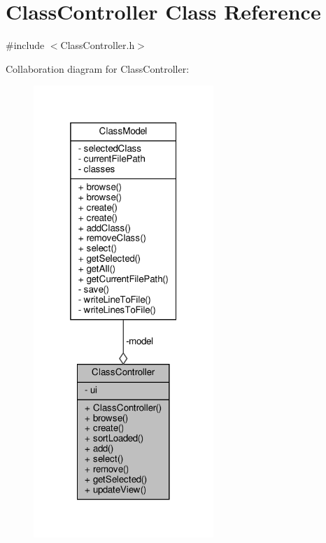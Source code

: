 \hypertarget{classClassController}{}\section{Class\+Controller Class Reference}
\label{classClassController}


{\ttfamily \#include $<$Class\+Controller.\+h$>$}



Collaboration diagram for Class\+Controller\+:\nopagebreak
\begin{figure}[H]
\begin{center}
\leavevmode
\includegraphics[width=193pt]{classClassController__coll__graph}
\end{center}
\end{figure}
